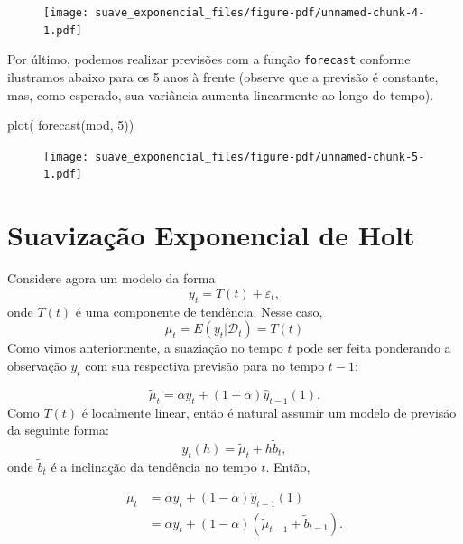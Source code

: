 \documentclass[
  letterpaper,
  DIV=11,
  numbers=noendperiod]{scrreprt}
\newenvironment{Shaded}{\begin{snugshade}}{\end{snugshade}}
\newcommand{\DecValTok}[1]{\textcolor[rgb]{0.68,0.00,0.00}{#1}}
\newcommand{\FunctionTok}[1]{\textcolor[rgb]{0.28,0.35,0.67}{#1}}
\newcommand{\NormalTok}[1]{\textcolor[rgb]{0.00,0.23,0.31}{#1}}
\theoremstyle{definition}
\theoremstyle{plain}
\theoremstyle{definition}
\theoremstyle{plain}
\theoremstyle{remark}
\begin{document}
\begin{figure}[H]

{\centering \texttt{[image: suave\_exponencial\_files/figure-pdf/unnamed-chunk-4-1.pdf]}

}

\end{figure}

Por último, podemos realizar previsões com a função \texttt{forecast}
conforme ilustramos abaixo para os 5 anos à frente (observe que a
previsão é constante, mas, como esperado, sua variância aumenta
linearmente ao longo do tempo).

\begin{Shaded}
\begin{Highlighting}[]
\FunctionTok{plot}\NormalTok{( }\FunctionTok{forecast}\NormalTok{(mod, }\DecValTok{5}\NormalTok{))}
\end{Highlighting}
\end{Shaded}

\begin{figure}[H]

{\centering \texttt{[image: suave\_exponencial\_files/figure-pdf/unnamed-chunk-5-1.pdf]}

}

\end{figure}

\hypertarget{suavizauxe7uxe3o-exponencial-de-holt}{%
\section{Suavização Exponencial de
Holt}\label{suavizauxe7uxe3o-exponencial-de-holt}}

Considere agora um modelo da forma \[y_t = T(t) + \varepsilon_t,\] onde
\(T(t)\) é uma componente de tendência. Nesse caso,
\[\mu_t=E(y_t|\mathcal{D}_t)=T(t)\] Como vimos anteriormente, a
suaziação no tempo \(t\) pode ser feita ponderando a observação \(y_t\)
com sua respectiva previsão para no tempo \(t-1\):

\[\tilde{\mu}_t=\alpha y_t + (1-\alpha)\hat{y}_{t-1}(1).\] Como \(T(t)\)
é localmente linear, então é natural assumir um modelo de previsão da
seguinte forma: \[y_t(h)= \tilde{\mu}_t+ h\tilde{b}_t,\] onde
\(\tilde{b}_t\) é a inclinação da tendência no tempo \(t\). Então,

\[\begin{align*}
    \tilde{\mu}_t &= \alpha y_t + (1-\alpha)\hat{y}_{t-1}(1) \\ 
    &=\alpha y_t + (1-\alpha)\left( \tilde{\mu}_{t-1} + \tilde{b}_{t-1}\right).
    \end{align*}\]
\end{document}
